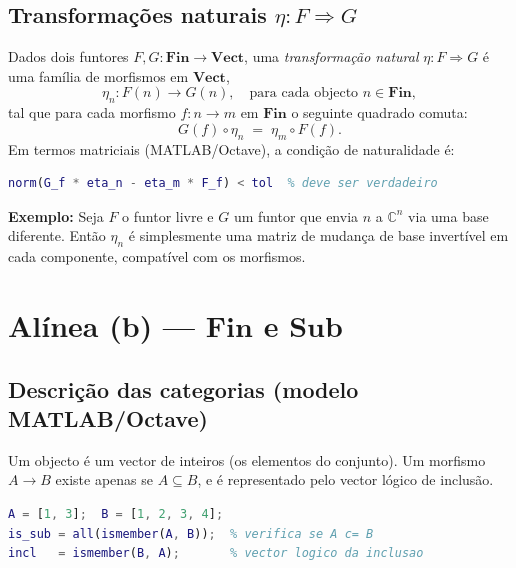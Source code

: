 \documentclass[12pt,a4paper]{article}
\newcommand{\catname}[1]{\mathbf{#1}}
\newcommand{\Fin}{\catname{Fin}}
\newcommand{\Vect}{\catname{Vect}}
\newcommand{\Sub}{\catname{Sub}}
\newcommand{\C}{\mathbb{C}}
\begin{document}
\subsection{Transformações naturais \texorpdfstring{$\eta \colon F \Rightarrow G$}{eta: F => G}}

Dados dois funtores $F, G \colon \Fin \to \Vect$, uma \emph{transformação natural} $\eta \colon F \Rightarrow G$ é uma família de morfismos em $\Vect$,
\[
  \eta_n \colon F(n) \to G(n), \quad \text{para cada objecto } n \in \Fin,
\]
tal que para cada morfismo $f \colon n \to m$ em $\Fin$ o seguinte quadrado comuta:
\[
  G(f) \circ \eta_n \;=\; \eta_m \circ F(f).
\]
Em termos matriciais (MATLAB/Octave), a condição de naturalidade é:

\begin{lstlisting}[language=Matlab, caption={Condição de naturalidade em $\Vect$}]
% G_f, F_f: matrizes de F(f) e G(f); eta_n, eta_m: componentes de eta
norm(G_f * eta_n - eta_m * F_f) < tol  % deve ser verdadeiro
\end{lstlisting}

\noindent\textbf{Exemplo:} Seja $F$ o funtor livre e $G$ um funtor que envia $n$ a $\C^n$ via uma base diferente. Então $\eta_n$ é simplesmente uma matriz de mudança de base invertível em cada componente, compatível com os morfismos.

\section{Alínea (b) --- \texorpdfstring{$\Fin$}{Fin} e \texorpdfstring{$\Sub$}{Sub}}

\subsection{Descrição das categorias (modelo MATLAB/Octave)}

\begin{defbox}[Categoria $\Sub$]
Um objecto é um vector de inteiros (os elementos do conjunto). Um morfismo $A \to B$ existe apenas se $A \subseteq B$, e é representado pelo vector lógico de inclusão.
\end{defbox}

\begin{lstlisting}[language=Matlab, caption={Morfismo de inclusão em $\Sub$}]
A = [1, 3];  B = [1, 2, 3, 4];
is_sub = all(ismember(A, B));  % verifica se A c= B
incl   = ismember(B, A);       % vector logico da inclusao
\end{lstlisting}
\end{document}
